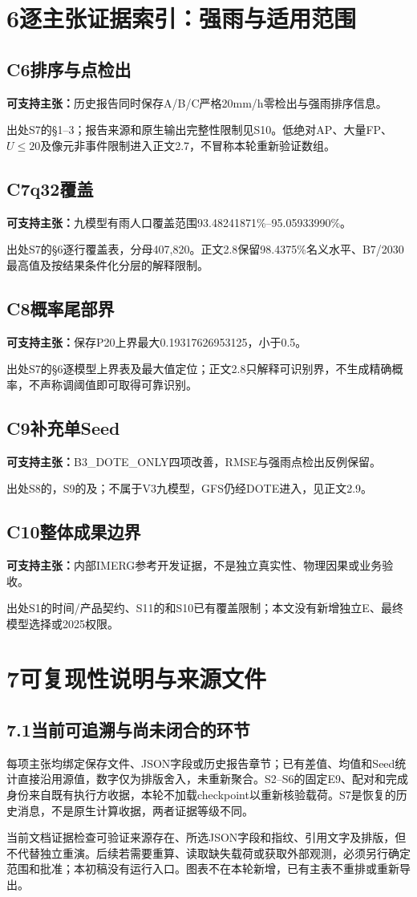 \documentclass[UTF8,10.5pt,a4paper,fontset=none]{ctexart}
\newcommand{\nextpart}[1]{\clearpage\section*{#1}}
\newcommand{\claim}[2]{\subsection*{#1}\noindent\textbf{可支持主张：}#2\par}
\begin{document}
\nextpart{6\quad 逐主张证据索引：强雨与适用范围}
\claim{C6\quad 排序与点检出}{历史报告同时保存A/B/C严格20mm/h零检出与强雨排序信息。}
\noindent 出处S7的§1--3；报告来源和原生输出完整性限制见S10。低绝对AP、大量FP、$U\le20$及像元非事件限制进入正文2.7，不冒称本轮重新验证数组。
\claim{C7\quad q32覆盖}{九模型有雨人口覆盖范围93.48241871\%--95.05933990\%。}
\noindent 出处S7的§6逐行覆盖表，分母407,820。正文2.8保留98.4375\%名义水平、B7/2030最高值及按结果条件化分层的解释限制。
\claim{C8\quad 概率尾部界}{保存P20上界最大0.19317626953125，小于0.5。}
\noindent 出处S7的§6逐模型上界表及最大值定位；正文2.8只解释可识别界，不生成精确概率，不声称调阈值即可取得可靠识别。
\claim{C9\quad 补充单Seed}{B3\_DOTE\_ONLY四项改善，RMSE与强雨点检出反例保留。}
\noindent 出处S8的，S9的及；不属于V3九模型，GFS仍经DOTE进入，见正文2.9。
\claim{C10\quad 整体成果边界}{内部IMERG参考开发证据，不是独立真实性、物理因果或业务验收。}
\noindent 出处S1的时间/产品契约、S11的和S10已有覆盖限制；本文没有新增独立E、最终模型选择或2025权限。

\nextpart{7\quad 可复现性说明与来源文件}
\subsection*{7.1\quad 当前可追溯与尚未闭合的环节}
每项主张均绑定保存文件、JSON字段或历史报告章节；已有差值、均值和Seed统计直接沿用源值，数字仅为排版舍入，未重新聚合。S2--S6的固定E9、配对和完成身份来自既有执行方收据，本轮不加载checkpoint以重新核验载荷。S7是恢复的历史消息，不是原生计算收据，两者证据等级不同。

当前文档证据检查可验证来源存在、所选JSON字段和指纹、引用文字及排版，但不代替独立重演。后续若需要重算、读取缺失载荷或获取外部观测，必须另行确定范围和批准；本初稿没有运行入口。图表不在本轮新增，已有主表不重排或重新导出。
\end{document}

